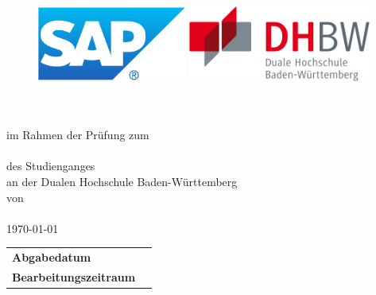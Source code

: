 {
\begin{titlepage}
	\enlargethispage{4cm}
	\begin{figure}
		\begin{minipage}{0.49\textwidth}
			\flushleft
			\includegraphics[height=2.5cm]{images/logos/Logo_SAP.pdf} 
		\end{minipage}
		\hfill
		\begin{minipage}{0.49\textwidth}
			\flushright
			\includegraphics[height=2.5cm]{images/logos/dhbw.pdf} 
		\end{minipage}
	\end{figure} 
	\vspace*{0.1cm}
	\begin{center}
		\huge{\textbf{\titel}}\\[1.5cm]
		\Large{\textbf{\arbeit}}\\[0.5cm]
		\normalsize{im Rahmen der Prüfung zum\\[1ex] \textbf{\abschluss}}\\[0.5cm]
		\Large{des Studienganges \studiengang}\\[1ex]
		\normalsize{an der Dualen Hochschule Baden-Württemberg \dhbwStandort}\\[1cm]
		\normalsize{von}\\[1ex] \Large{\textbf{\vorname\,\nachname}} \\[1cm]
		\normalsize{{\printdayoff\today}}\\[2.25cm]
		\begin{spacing}{0.8}
			\begin{tabular}{ll}
				\textbf{Abgabedatum}				\hspace{4.5cm}					& \printdate{\abgabeDatum}\\[0.2cm]
				\textbf{Bearbeitungszeitraum}       				&  \daterange{\bearbeitungszeitraumBeginn}{\bearbeitungszeitraumEnde}\\[0.2cm]

\end{tabular}
\end{spacing}
\end{center}
\end{titlepage}}
